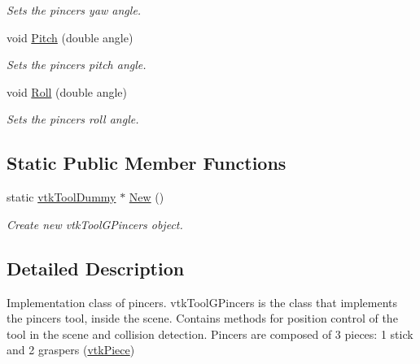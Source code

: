 \begin{DoxyCompactItemize}
\begin{DoxyCompactList}\small\item\em Sets the pincers yaw angle. \item\end{DoxyCompactList}\item 
\hypertarget{classvtkToolDummy_a5ea0a677fb4cae300394b118197f2c8b}{
void \hyperlink{classvtkToolDummy_a5ea0a677fb4cae300394b118197f2c8b}{Pitch} (double angle)}
\label{classvtkToolDummy_a5ea0a677fb4cae300394b118197f2c8b}

\begin{DoxyCompactList}\small\item\em Sets the pincers pitch angle. \item\end{DoxyCompactList}\item 
\hypertarget{classvtkToolDummy_af3e1893d057ad3db3775c4cffd6a8b18}{
void \hyperlink{classvtkToolDummy_af3e1893d057ad3db3775c4cffd6a8b18}{Roll} (double angle)}
\label{classvtkToolDummy_af3e1893d057ad3db3775c4cffd6a8b18}

\begin{DoxyCompactList}\small\item\em Sets the pincers roll angle. \item\end{DoxyCompactList}\end{DoxyCompactItemize}
\subsection*{Static Public Member Functions}
\begin{DoxyCompactItemize}
\item 
\hypertarget{classvtkToolDummy_a3fc4028c21d848a4eb9db02555689c1a}{
static \hyperlink{classvtkToolDummy}{vtkToolDummy} $\ast$ \hyperlink{classvtkToolDummy_a3fc4028c21d848a4eb9db02555689c1a}{New} ()}
\label{classvtkToolDummy_a3fc4028c21d848a4eb9db02555689c1a}

\begin{DoxyCompactList}\small\item\em Create new vtkToolGPincers object. \item\end{DoxyCompactList}\end{DoxyCompactItemize}


\subsection{Detailed Description}
Implementation class of pincers. vtkToolGPincers is the class that implements the pincers tool, inside the scene. Contains methods for position control of the tool in the scene and collision detection. Pincers are composed of 3 pieces: 1 stick and 2 graspers (\hyperlink{classvtkPiece}{vtkPiece}) 

